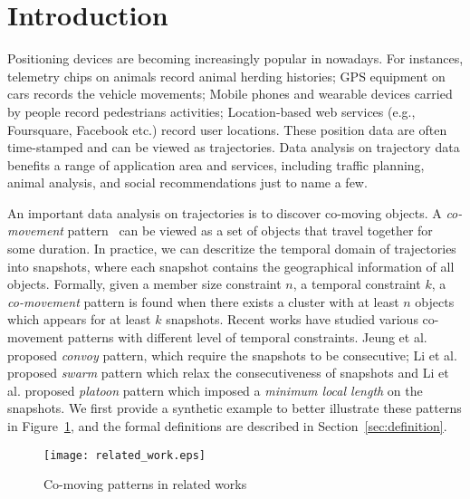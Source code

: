 \section{Introduction}
Positioning devices are becoming increasingly popular in nowadays. For instances, telemetry chips on animals record animal herding histories; GPS equipment on cars records the vehicle movements; Mobile phones and wearable devices carried by people record pedestrians activities; Location-based web services (e.g., Foursquare, Facebook etc.) record user locations. These position data are often time-stamped and can be viewed as trajectories. Data analysis on trajectory data benefits a range of application area and services, including traffic planning, animal analysis, and social recommendations just to name a few. 

An important data analysis on trajectories is to discover co-moving objects. A \emph{co-movement} pattern~\cite{li2013managing} can be viewed as a set of objects that travel together for some duration. In practice, we can descritize the temporal domain of trajectories into snapshots, where each snapshot contains the geographical information of all objects. Formally, given a member size constraint $n$, a temporal constraint $k$, a \emph{co-movement} pattern is found when there exists a cluster with at least $n$ objects which appears for at least $k$ snapshots. Recent works have studied various co-movement patterns with different level of temporal constraints. Jeung et al. proposed \emph{convoy} pattern, which require the snapshots to be consecutive; Li et al. proposed \emph{swarm} pattern which relax the consecutiveness of snapshots and Li et al. proposed \emph{platoon} pattern which imposed a \emph{minimum local length} on the snapshots. We first provide a synthetic example to better illustrate these patterns in Figure~\ref{fig:related_work}, and the formal definitions are described in Section~\ref{sec:definition}.
\begin{figure} [h]
\center
\texttt{[image: related\_work.eps]}
\caption{Co-moving patterns in related works}
\label{fig:related_work}
\end{figure}


